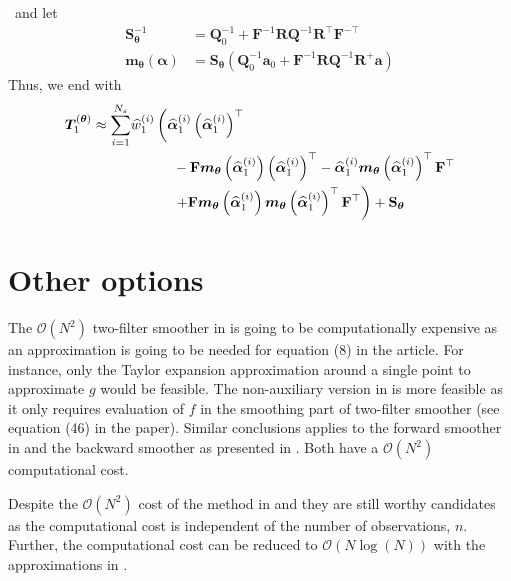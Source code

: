 \documentclass[9pt, notitlepage]{article}
\renewcommand{\vec}[1]{\bm{#1}}
\newcommand{\mat}[1]{\mathbf{#1}}
\newcommand{\Lparen}[1]{\left( #1\right)}
\newcommand{\optor}[2]{#1\Lparen{#2}}
\newcommand{\particS}[3]{\widehat{#1}_{#2}^{\Lparen{#3}}}
\newcommand{\bigO}[1]{\mathcal{O}\Lparen{#1}}
\newcommand{\nPart}{N}
\begin{document}
~and let %
%
\begin{equation}\begin{split}
	\mat{S}_{\vec{\theta}}^{-1} &=
		\mat{Q}_0^{-1} + \mat{F}^{-1}\mat{R}\mat{Q}^{-1}\mat{R}^\top\mat{F}^{-\top} \\
%
	\optor{\vec{m}_{\vec{\theta}}}{\vec{\alpha}} &=
		\mat{S}_{\vec{\theta}}
		\Lparen{\mat{Q}_0^{-1}\vec{a}_0 + \mat{F}^{-1}\mat{R}\mat{Q}^{-1}\mat{R}^+\vec{a}}
\end{split}\end{equation}%
%
Thus, we end with%
%
\begin{equation}\begin{split}
\vec{T}_1^{(\vec{\theta})} \approx
	\sum_{i = 1}^{\nPart_s} \hspace{30pt} & \hspace{-30pt} \particS{w}{1}{i}\left(
		\particS{\vec{\alpha}}{1}{i}\Lparen{\particS{\vec{\alpha}}{1}{i}}^\top \right. \\
%
	&  -\mat{F}\optor{\vec{m}_{\vec{\theta}}}{\particS{\vec{\alpha}}{1}{i}}
		\Lparen{\particS{\vec{\alpha}}{1}{i}}^\top
	- \particS{\vec{\alpha}}{1}{i}
		\optor{\vec{m}_{\vec{\theta}}}{\particS{\vec{\alpha}}{1}{i}}^\top\mat{F}^\top \\
%
	& \left. + \mat{F}
		\optor{\vec{m}_{\vec{\theta}}}{\particS{\vec{\alpha}}{1}{i}}
		\optor{\vec{m}_{\vec{\theta}}}{\particS{\vec{\alpha}}{1}{i}}^\top
	\mat{F}^\top \right) + \mat{S}_{\vec{\theta}}
\end{split}\end{equation}

\section{Other options}
The $\bigO{\nPart^2}$ two-filter smoother in \cite{fearnhead10} is going to be computationally expensive as an approximation is going to be needed for equation (8) in the article. For instance, only the Taylor expansion approximation around a single point to approximate $g$ would be feasible. The non-auxiliary version in \citet{briers10} is more feasible as it only requires evaluation of $f$ in the smoothing part of two-filter smoother (see equation (46) in the paper). Similar conclusions applies to the forward smoother in \cite{del10} and the backward smoother as presented in \cite{kantas15}. Both have a $\bigO{\nPart^2}$ computational cost.

Despite the $\bigO{\nPart^2}$ cost of the method in \citet{briers10} and \cite{del10} they are still worthy candidates as the computational cost is independent of the number of observations, $n$.  Further, the computational cost can be reduced to $\bigO{\nPart\log(\nPart)}$ with the approximations in \cite{klaas06}.
\end{document}
